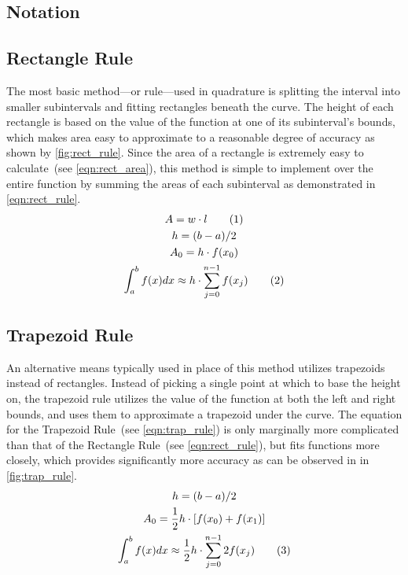 \documentclass{paper}
\begin{document}
\subsection{Notation}
\label{sec:notation}
\subsection{Rectangle Rule}
\label{sec:rect_rule}
The most basic method---or rule---used in quadrature is splitting the interval into smaller subintervals and fitting rectangles beneath the curve.
The height of each rectangle is based on the value of the function at one of its subinterval's bounds, which makes area easy to approximate to a reasonable degree of accuracy as shown by \cref{fig:rect_rule}.
Since the area of a rectangle is extremely easy to calculate~(see \cref{eqn:rect_area}), this method is simple to implement over the entire function by summing the areas of each subinterval as demonstrated in \cref{eqn:rect_rule}.\autocite{num_methods}
%
\begin{gather*}
    A = w \cdot l \tageq\label{eqn:rect_area}                                           \\
    h = (b - a) / 2                                                                     \\
    A_{0} = h \cdot f(x_0)                                                         \\
    \int_a^b f(x) dx \approx h \cdot \sum^{n-1}_{j=0}f(x_j) \tageq\label{eqn:rect_rule}
\end{gather*}
%

%
\subsection{Trapezoid Rule}
\label{sec:trap_rule}
An alternative means typically used in place of this method utilizes trapezoids instead of rectangles.
Instead of picking a single point at which to base the height on, the trapezoid rule utilizes the value of the function at both the left and right bounds, and uses them to approximate a trapezoid under the curve.
The equation for the Trapezoid Rule~(see \cref{eqn:trap_rule}) is only marginally more complicated than that of the Rectangle Rule~(see \cref{eqn:rect_rule}), but fits functions more closely, which provides significantly more accuracy as can be observed in in \cref{fig:trap_rule}.\autocite{num_methods}
%
\begin{gather*}
    h = (b - a) / 2                                                                                 \\
    A_{0} = \frac{1}{2} h \cdot \left[f(x_0) + f(x_1)\right]                                   \\
    \int_a^b f(x) dx \approx \frac{1}{2}h \cdot \sum^{n-1}_{j=0}2f(x_j) \tageq\label{eqn:trap_rule}
\end{gather*}
%

%
\end{document}
